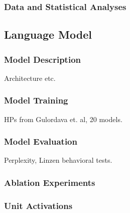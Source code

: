 \subsubsection{Data and Statistical Analyses}


\subsection{Language Model}

\subsubsection{Model Description} Architecture etc.
\subsubsection{Model Training} HPs from Gulordava et. al, 20 models. 
\subsubsection{Model Evaluation} Perplexity, Linzen behavioral tests.
\subsubsection{Ablation Experiments}
\subsubsection{Unit Activations}


